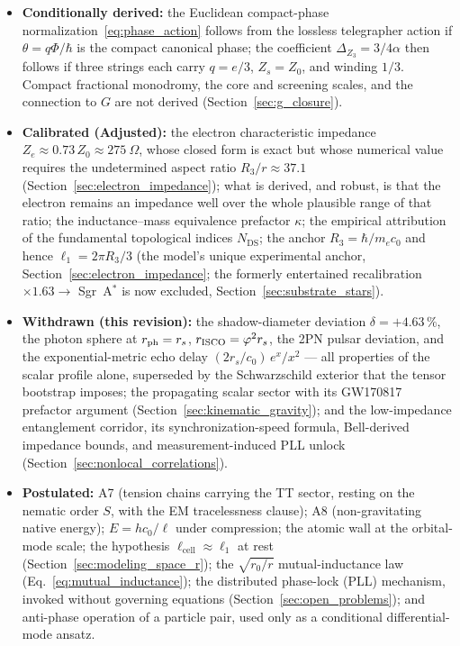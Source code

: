\documentclass[11pt,a4paper]{article}
\theoremstyle{plain}
\theoremstyle{remark}
\newcommand{\Ncd}{\ensuremath{N_{\mathrm{DS}}}}
\begin{document}
\begin{itemize}
    \item \textbf{Conditionally derived:} the Euclidean compact-phase normalization~\eqref{eq:phase_action} follows from the lossless telegrapher action if $\theta=q\Phi/\hbar$ is the compact canonical phase; the coefficient $\Delta_{Z_3}=3/4\alpha$ then follows if three strings each carry $q=e/3$, $Z_s=Z_0$, and winding $1/3$. Compact fractional monodromy, the core and screening scales, and the connection to $G$ are not derived (Section~\ref{sec:g_closure}).
    \item \textbf{Calibrated (Adjusted):} the electron characteristic impedance $Z_e \approx 0.73\,Z_0 \approx 275~\Omega$, whose closed form is exact but whose numerical value requires the undetermined aspect ratio $R_3/r \approx 37.1$ (Section~\ref{sec:electron_impedance}); what is derived, and robust, is that the electron remains an impedance well over the whole plausible range of that ratio; the inductance--mass equivalence prefactor $\kappa$; the empirical attribution of the fundamental topological indices $\Ncd$; the anchor $R_3 = \hbar/m_e c_0$ and hence $\ell_1 = 2\pi R_3/3$ (the model's unique experimental anchor, Section~\ref{sec:electron_impedance}; the formerly entertained recalibration $\times1.63 \to$ Sgr~A$^*$ is now excluded, Section~\ref{sec:substrate_stars}).
    \item \textbf{Withdrawn (this revision):} the shadow-diameter deviation $\delta = +4.63\,\%$, the photon sphere at $r_{\rm ph} = r_s$, $r_{\rm ISCO} = \varphi^2 r_s$, the 2PN pulsar deviation, and the exponential-metric echo delay $(2r_s/c_0)\,e^x/x^2$ --- all properties of the scalar profile alone, superseded by the Schwarzschild exterior that the tensor bootstrap imposes; the propagating scalar sector with its GW170817 prefactor argument (Section~\ref{sec:kinematic_gravity}); and the low-impedance entanglement corridor, its synchronization-speed formula, Bell-derived impedance bounds, and measurement-induced PLL unlock (Section~\ref{sec:nonlocal_correlations}).
    \item \textbf{Postulated:} A7 (tension chains carrying the TT sector, resting on the nematic order $S$, with the EM tracelessness clause); A8 (non-gravitating native energy); $E = hc_0/\ell$ under compression; the atomic wall at the orbital-mode scale; the hypothesis $\ell_{\text{cell}} \approx \ell_1$ at rest (Section~\ref{sec:modeling_space_r}); the $\sqrt{r_0/r}$ mutual-inductance law (Eq.~\ref{eq:mutual_inductance}); the distributed phase-lock (PLL) mechanism, invoked without governing equations (Section~\ref{sec:open_problems}); and anti-phase operation of a particle pair, used only as a conditional differential-mode ansatz.

\end{itemize}
\end{document}
